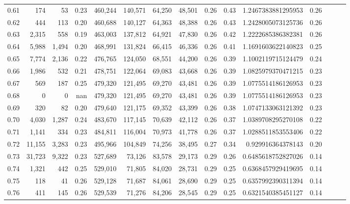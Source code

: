 \begin{tabular}{rrrrrrrrrrrrrrr}
0.61 &     174 &     53 &  0.23 &  460,244 &  140,571 &   64,250 &   48,501 &  0.26 &  0.43 &   1.2467383881295953 &      0.26 \\
0.62 &     444 &    113 &  0.20 &  460,688 &  140,127 &   64,363 &   48,388 &  0.26 &  0.43 &   1.2428005073125736 &      0.26 \\
0.63 &   2,315 &    558 &  0.19 &  463,003 &  137,812 &   64,921 &   47,830 &  0.26 &  0.42 &   1.2222685386382381 &      0.26 \\
0.64 &   5,988 &  1,494 &  0.20 &  468,991 &  131,824 &   66,415 &   46,336 &  0.26 &  0.41 &   1.1691603622140823 &      0.25 \\
0.65 &   7,774 &  2,136 &  0.22 &  476,765 &  124,050 &   68,551 &   44,200 &  0.26 &  0.39 &   1.1002119715124479 &      0.24 \\
0.66 &   1,986 &    532 &  0.21 &  478,751 &  122,064 &   69,083 &   43,668 &  0.26 &  0.39 &   1.0825979370471215 &      0.23 \\
0.67 &     569 &    187 &  0.25 &  479,320 &  121,495 &   69,270 &   43,481 &  0.26 &  0.39 &   1.0775514186126953 &      0.23 \\
0.68 &       0 &      0 &   nan &  479,320 &  121,495 &   69,270 &   43,481 &  0.26 &  0.39 &   1.0775514186126953 &      0.23 \\
0.69 &     320 &     82 &  0.20 &  479,640 &  121,175 &   69,352 &   43,399 &  0.26 &  0.38 &   1.0747133063121392 &      0.23 \\
0.70 &   4,030 &  1,287 &  0.24 &  483,670 &  117,145 &   70,639 &   42,112 &  0.26 &  0.37 &   1.0389708295270108 &      0.22 \\
0.71 &   1,141 &    334 &  0.23 &  484,811 &  116,004 &   70,973 &   41,778 &  0.26 &  0.37 &   1.0288511853553406 &      0.22 \\
0.72 &  11,155 &  3,283 &  0.23 &  495,966 &  104,849 &   74,256 &   38,495 &  0.27 &  0.34 &    0.929916364378143 &      0.20 \\
0.73 &  31,723 &  9,322 &  0.23 &  527,689 &   73,126 &   83,578 &   29,173 &  0.29 &  0.26 &   0.6485618752827026 &      0.14 \\
0.74 &   1,321 &    442 &  0.25 &  529,010 &   71,805 &   84,020 &   28,731 &  0.29 &  0.25 &   0.6368457929419695 &      0.14 \\
0.75 &     118 &     41 &  0.26 &  529,128 &   71,687 &   84,061 &   28,690 &  0.29 &  0.25 &   0.6357992390311394 &      0.14 \\
0.76 &     411 &    145 &  0.26 &  529,539 &   71,276 &   84,206 &   28,545 &  0.29 &  0.25 &   0.6321540385451127 &      0.14 \\

\end{tabular}
